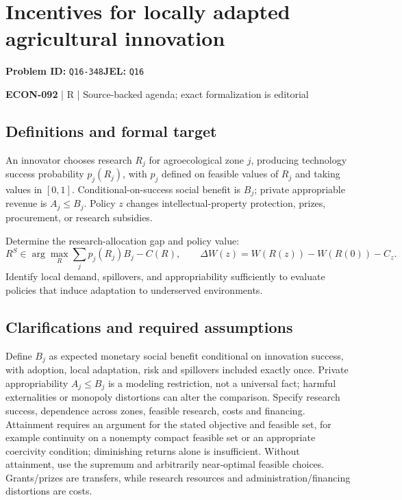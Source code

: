 \documentclass[11pt,a4paper]{article}
\begin{document}
\section*{Incentives for locally adapted agricultural innovation}
\textbf{Problem ID:} \texttt{Q16-348}\quad \textbf{JEL:} \texttt{Q16}\par
\label{problem:OP-0651}


\label{audited:ECON-092}

{\sffamily\small\color{muted}\textbf{ECON-092} | R | Source-backed agenda; exact formalization is editorial\par}

\subsection*{Definitions and formal target}

An innovator chooses research $R_j$ for agroecological zone $j$, producing technology success probability $p_j(R_j)$, with $p_j$ defined on feasible values of $R_j$ and taking values in $[0,1]$. Conditional-on-success social benefit is $B_j$; private appropriable revenue is $A_j\leq B_j$. Policy $z$ changes intellectual-property protection, prizes, procurement, or research subsidies.

Determine the research-allocation gap and policy value:
\[
 R^S\in\arg\max_R\sum_jp_j(R_j)B_j-C(R),\qquad
 \Delta W(z)=W(R(z))-W(R(0))-C_z.
\]
Identify local demand, spillovers, and appropriability sufficiently to evaluate policies that induce adaptation to underserved environments.

\subsection*{Clarifications and required assumptions}

Define \(B_j\) as expected monetary social benefit conditional on innovation success, with adoption, local adaptation, risk and spillovers included exactly once. Private appropriability \(A_j\leq B_j\) is a modeling restriction, not a universal fact; harmful externalities or monopoly distortions can alter the comparison. Specify research success, dependence across zones, feasible research, costs and financing. Attainment requires an argument for the stated objective and feasible set, for example continuity on a nonempty compact feasible set or an appropriate coercivity condition; diminishing returns alone is insufficient. Without attainment, use the supremum and arbitrarily near-optimal feasible choices. Grants/prizes are transfers, while research resources and administration/financing distortions are costs.
\end{document}
